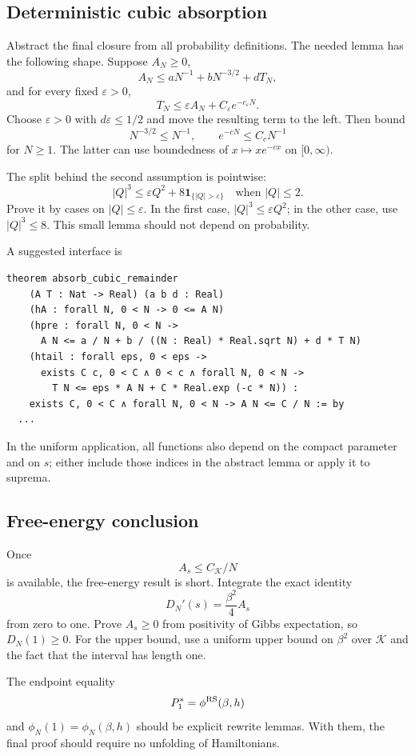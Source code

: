 \documentclass[11pt]{article}
\numberwithin{equation}{section}
\newcommand{\1}{\mathbf 1}
\begin{document}
\subsection{Deterministic cubic absorption}

Abstract the final closure from all probability definitions.  The needed
lemma has the following shape.  Suppose $A_N\ge0$,
\[
 A_N\le aN^{-1}+bN^{-3/2}+dT_N,
\]
and for every fixed $\varepsilon>0$,
\[
 T_N\le\varepsilon A_N+C_\varepsilon e^{-c_\varepsilon N}.
\]
Choose $\varepsilon>0$ with $d\varepsilon\le1/2$ and move the resulting term
to the left.  Then bound
\[
 N^{-3/2}\le N^{-1},\qquad
 e^{-cN}\le C_cN^{-1}
\]
for $N\ge1$.  The latter can use boundedness of
$x\mapsto xe^{-cx}$ on $[0,\infty)$.

The split behind the second assumption is pointwise:
\[
 |Q|^3
 \le\varepsilon Q^2+
 8\1_{\{|Q|>\varepsilon\}}
 \quad\text{when }|Q|\le2.
\]
Prove it by cases on $|Q|\le\varepsilon$.  In the first case,
$|Q|^3\le\varepsilon Q^2$; in the other case, use $|Q|^3\le8$.
This small lemma should not depend on probability.

A suggested interface is
\begin{lstlisting}
theorem absorb_cubic_remainder
    (A T : Nat -> Real) (a b d : Real)
    (hA : forall N, 0 < N -> 0 <= A N)
    (hpre : forall N, 0 < N ->
      A N <= a / N + b / ((N : Real) * Real.sqrt N) + d * T N)
    (htail : forall eps, 0 < eps ->
      exists C c, 0 < C ∧ 0 < c ∧ forall N, 0 < N ->
        T N <= eps * A N + C * Real.exp (-c * N)) :
    exists C, 0 < C ∧ forall N, 0 < N -> A N <= C / N := by
  ...
\end{lstlisting}
In the uniform application, all functions also depend on the compact
parameter and on $s$; either include those indices in the abstract lemma or
apply it to suprema.

\subsection{Free-energy conclusion}

Once
\[
 A_s\le C_{\mathcal K}/N
\]
is available, the free-energy result is short.  Integrate the exact identity
\[
 D_N'(s)=\frac{\beta^2}{4}A_s
\]
from zero to one.  Prove $A_s\ge0$ from positivity of Gibbs expectation, so
$D_N(1)\ge0$.  For the upper bound, use a uniform upper bound on $\beta^2$
over $\mathcal K$ and the fact that the interval has length one.

The endpoint equality
\[
P_1^*=\phi^{\rm RS}(\beta,h)
\]
and $\phi_N(1)=\phi_N(\beta,h)$ should be explicit rewrite lemmas.  With
them, the final proof should require no unfolding of Hamiltonians.
\end{document}

